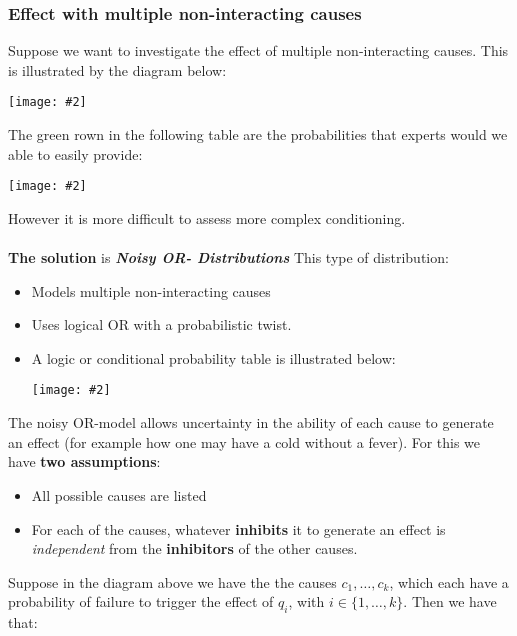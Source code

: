 \documentclass{article}
\def\blu#1{{\color{blu}#1}}
\newcommand{\centerfig}[2]{\begin{center}\texttt{[image: \#2]}\end{center}}
\begin{document}
\subsubsection*{Effect with multiple non-interacting causes}
Suppose we want to investigate the effect of multiple non-interacting causes. This is illustrated by the diagram below:
\centerfig{0.5}{BN-8}
The green rown in the following table are the probabilities that experts would we able to easily provide:
\centerfig{0.6}{BN-9}
However it is more difficult to assess more complex conditioning. \\
\\
\textbf{The solution} is \textbf{\textit{Noisy OR- Distributions}}
This type of distribution:
\begin{itemize}
	\item Models multiple non-interacting causes
	\item Uses logical OR with a probabilistic twist. 
	\item A logic or conditional probability table is illustrated below:
	\centerfig{0.6}{BN-10}
\end{itemize}
The noisy OR-model allows uncertainty in the ability of each cause to generate an effect (for example how one may have a cold without a fever). For this we have \textbf{two assumptions}:
\begin{itemize}
	\item All possible causes are listed
	\item For each of the causes, whatever \textbf{\blu{inhibits}} it to generate an effect is \textit{independent} from the \textbf{\blu{inhibitors}} of the other causes.
\end{itemize}
\begin{center}

\end{center}
Suppose in the diagram above we have the the causes $ c_1, \dots, c_k $, which each have a probability of failure to trigger the effect of $ q_i $, with $ i \in \{1, \dots, k\} $. Then we have that:
\end{document}
